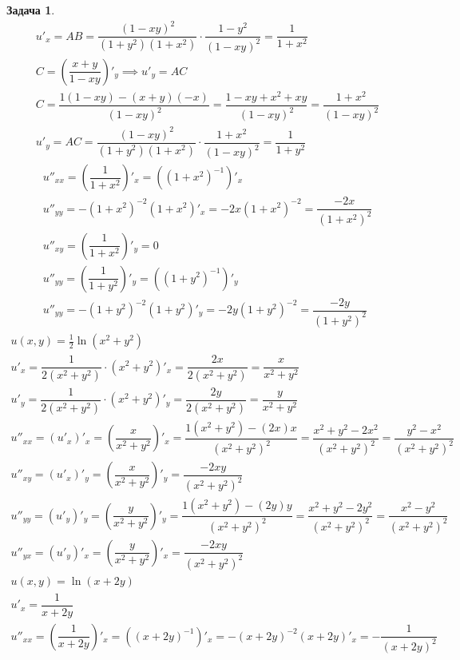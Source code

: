 \documentclass[a4paper,fleqn,12pt]{article}
\theoremstyle{definition}
\newtheorem{task}{Задача}[subsection]
\begin{document}
\begin{task}
\begin{gather*}
u'_x = AB =  \dfrac{(1-xy)^2}{(1 + y^2) (1 + x^2)} \cdot \dfrac {1-y^2}{(1 - xy)^2} = \dfrac{1}{1 + x^2}\\
C = \left( \dfrac{x+y}{1-xy} \right)'_y \implies u'_y = AC\\
C = \dfrac{1(1 -xy) - (x+y)(-x)}{(1 - xy)^2} = \dfrac{1 -xy + x^2 +xy}{(1 - xy)^2} = \dfrac{1 + x^2}{(1 - xy)^2}\\
u'_y = AC = \dfrac{(1-xy)^2}{(1 + y^2) (1 + x^2)} \cdot \dfrac{1 + x^2}{(1 - xy)^2} = \dfrac{1}{1 + y^2}
\end{gather*}
\begin{gather*}
u''_{xx} =\left( \dfrac{1}{1 + x^2} \right)'_x = ((1 + x^2)^{-1})'_x\\
u''_{yy}= -(1 + x^2)^{-2}(1+x^2)'_x = -2x(1 + x^2)^{-2}  = \dfrac{-2x}{(1 + x^2)^2}\\
u''_{xy} =\left( \dfrac{1}{1 + x^2} \right)'_y = 0 \\
u''_{yy} =\left( \dfrac{1}{1 + y^2} \right)'_y = ((1 + y^2)^{-1})'_y\\
u''_{yy}= -(1 + y^2)^{-2}(1+y^2)'_y = -2y(1 + y^2)^{-2}  = \dfrac{-2y}{(1 + y^2)^2}
\end{gather*}
\begin{gather*}
u(x,y) = \frac{1}{2} \ln{(x^2 + y^2)}\\
u'_x = \dfrac{1}{2(x^2 + y^2)} \cdot (x^2 + y^2)'_x = \dfrac{2x}{2(x^2 + y^2)} = \dfrac{x}{x^2 + y^2}\\
u'_y = \dfrac{1}{2(x^2 + y^2)} \cdot (x^2 + y^2)'_y = \dfrac{2y}{2(x^2 + y^2)} = \dfrac{y}{x^2 + y^2}\\
u''_{xx} = (u'_x)'_x = \left( \dfrac{x}{x^2 + y^2} \right)'_x =  \dfrac{1(x^2 + y^2) - (2x)x}{(x^2 + y^2)^2} = \dfrac{x^2 + y^2 - 2x^2}{(x^2 + y^2)^2} = \dfrac{ y^2 - x^2}{(x^2 + y^2)^2}\\
u''_{xy} = (u'_x)'_y = \left( \dfrac{x}{x^2 + y^2} \right)'_y =  \dfrac{- 2xy}{(x^2 + y^2)^2}\\
u''_{yy} = (u'_y)'_y = \left( \dfrac{y}{x^2 + y^2} \right)'_y = \dfrac{1(x^2 + y^2) - (2y)y}{(x^2 + y^2)^2} = \dfrac{x^2 + y^2 - 2y^2}{(x^2 + y^2)^2} = \dfrac{x^2 - y^2}{(x^2 + y^2)^2}\\
u''_{yx} = (u'_y)'_x = \left( \dfrac{y}{x^2 + y^2} \right)'_x = \dfrac{- 2xy}{(x^2 + y^2)^2}
\end{gather*}
\begin{gather*}
u(x,y) = \ln{(x + 2y)}\\
u'_x = \dfrac{1}{x + 2y}\\
u''_{xx} = \left( \dfrac{1}{x + 2y} \right)'_x = ((x+2y)^{-1})'_x = -(x+2y)^{-2}(x+2y)'_x = - \dfrac{1}{(x+2y)^2} \\

\end{gather*}
\end{task}
\end{document}
